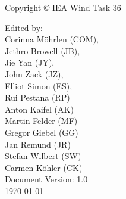 \thispagestyle{empty}
{\small
\strut\vfill %
\noindent Copyright \copyright{} IEA Wind Task 36\par
\vspace{0.2cm}
\noindent Edited by:\\
Corinna M{\"o}hrlen (COM), \\
Jethro Browell (JB), \\
Jie Yan (JY),\\
John Zack (JZ),\\
Elliot Simon (ES), \\
Rui Pestana (RP) \\
Anton Kaifel (AK)\\
Martin Felder (MF)\\
Gregor Giebel (GG)\\
Jan Remund (JR)\\
Stefan Wilbert (SW)\\
Carmen K{\"o}hler (CK)\\
%
Document Version: 1.0\\
\today
}
\clearpage
